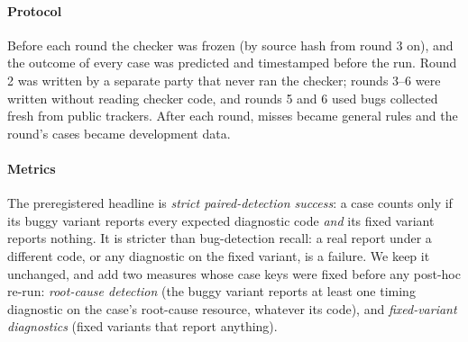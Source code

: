 \documentclass[acmtog,anonymous,review]{acmart}
\newcommand{\bench}{GPUBugBench\xspace}
\newcommand{\supp}[1]{Supplement~\S#1}
\begin{document}
\paragraph{Protocol}
Before each round the checker was frozen (by source hash from round 3 on), and the outcome of every case was predicted
and timestamped before the run. Round 2 was written by a separate party that never ran the checker; rounds 3--6 were
written without reading checker code, and rounds 5 and 6 used bugs collected fresh from public trackers. After each
round, misses became general rules and the round's cases became development data.

\paragraph{Metrics}
The preregistered headline is \emph{strict paired-detection success}: a case counts only if its buggy variant reports
every expected diagnostic code \emph{and} its fixed variant reports nothing. It is stricter than bug-detection recall:
a real report under a different code, or any diagnostic on the fixed variant, is a failure. We keep it unchanged, and
add two measures whose case keys were fixed before any post-hoc re-run: \emph{root-cause detection} (the buggy
variant reports at least one timing diagnostic on the case's root-cause resource, whatever its code), and
\emph{fixed-variant diagnostics} (fixed variants that report anything).

\begin{table}[t]
\caption{Blind detection on \bench, as run: each round scored by the checker frozen for it (fresh). Timing: strict
paired-detection success and root-cause detection. Structure is outside the synchronization guarantee and is given
for context (strict); the meaning cases, also outside it, are in \supp{H}. Fixed: fixed variants (all categories) with
any diagnostic / with a timing diagnostic. Pred.: predictions that held.}
\label{tab:blind}
\small
{}
\end{table}
\end{document}
